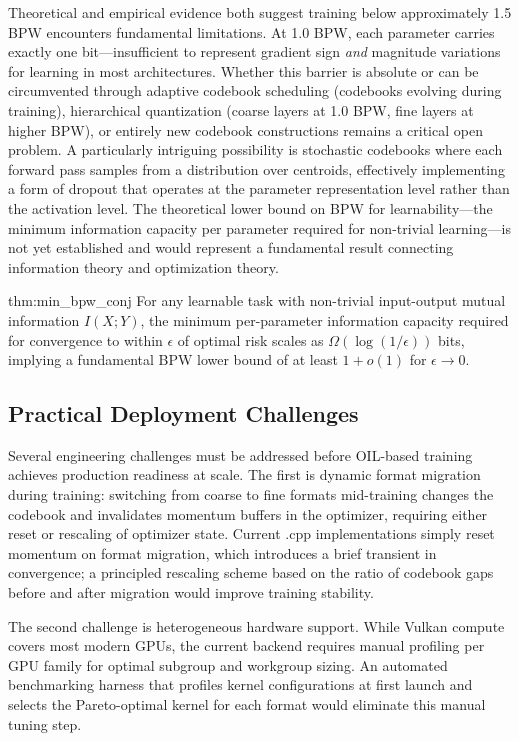 Theoretical and empirical evidence both suggest training below approximately 1.5 BPW encounters fundamental limitations. At 1.0 BPW, each parameter carries exactly one bit---insufficient to represent gradient sign \textit{and} magnitude variations for learning in most architectures. Whether this barrier is absolute or can be circumvented through adaptive codebook scheduling (codebooks evolving during training), hierarchical quantization (coarse layers at 1.0 BPW, fine layers at higher BPW), or entirely new codebook constructions remains a critical open problem. A particularly intriguing possibility is stochastic codebooks where each forward pass samples from a distribution over centroids, effectively implementing a form of dropout that operates at the parameter representation level rather than the activation level. The theoretical lower bound on BPW for learnability---the minimum information capacity per parameter required for non-trivial learning---is not yet established and would represent a fundamental result connecting information theory and optimization theory.

\begin{mythm}{thm:min_bpw_conj}
For any learnable task with non-trivial input-output mutual information $I(X;Y)$, the minimum per-parameter information capacity required for convergence to within $\epsilon$ of optimal risk scales as $\Omega(\log(1/\epsilon))$ bits, implying a fundamental BPW lower bound of at least $1 + o(1)$ for $\epsilon \to 0$.
\end{mythm}

\subsection{Practical Deployment Challenges}

Several engineering challenges must be addressed before OIL-based training achieves production readiness at scale. The first is dynamic format migration during training: switching from coarse to fine formats mid-training changes the codebook and invalidates momentum buffers in the optimizer, requiring either reset or rescaling of optimizer state. Current \MYTHOS{}.cpp implementations simply reset momentum on format migration, which introduces a brief transient in convergence; a principled rescaling scheme based on the ratio of codebook gaps before and after migration would improve training stability.

The second challenge is heterogeneous hardware support. While Vulkan compute covers most modern GPUs, the current backend requires manual profiling per GPU family for optimal subgroup and workgroup sizing. An automated benchmarking harness that profiles kernel configurations at first launch and selects the Pareto-optimal kernel for each format would eliminate this manual tuning step.

